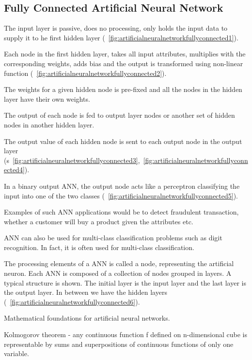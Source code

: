 	\subsection{Fully Connected Artificial Neural Network}
	\begin{numberedlist}
		\item The input layer is passive, does no processing, only holds the input data to supply it to he first hidden layer (\figurename~\ref{fig:artificialneuralnetworkfullyconnected1}).
		\item Each node in the first hidden layer, takes all input attributes, multiplies with the corresponding weights, adds bias and the output is transformed using non-linear
function (\figurename~\ref{fig:artificialneuralnetworkfullyconnected2}).
		\item The weights for a given hidden node is pre-fixed and all the nodes in the hidden layer have their own weights.
		\item The output of each node is fed to output layer nodes or another set of hidden nodes in another hidden layer.
		\item The output value of each hidden node is sent to each output node in the output layer (\figurename{}s~\ref{fig:artificialneuralnetworkfullyconnected3},~\ref{fig:artificialneuralnetworkfullyconnected4}).
		\item In a binary output ANN, the output node acts like a perceptron classifying the input into one of the two classes (\figurename~\ref{fig:artificialneuralnetworkfullyconnected5}).
		\item Examples of such ANN applications would be to detect fraudulent transaction, whether a customer will buy a product given the attributes etc.
		\item ANN can also be used for multi-class classification problems such as digit recognition. In fact, it is often used for multi-class classification.
		\item The processing elements of a ANN is called a node, representing the artificial neuron. Each ANN is composed of a collection of nodes grouped in layers.  A typical structure is shown.  The initial layer is the input layer and the last layer is the output layer.  In between we have the hidden layers (\figurename~\ref{fig:artificialneuralnetworkfullyconnected6}).
		\item Mathematical foundations for artificial neural networks.
		\begin{numberedlist}
			\item Kolmogorov theorem - any continuous function f defined on n-dimensional cube is representable by sums and superpositions of continuous functions of only one variable.

\end{numberedlist}
\end{numberedlist}
